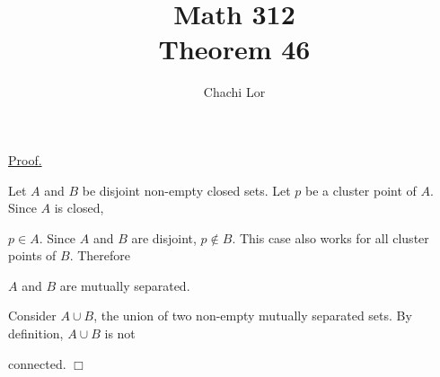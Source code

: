 \documentclass[a4paper]{article}
\title{Math 312\\Theorem 46}
\author{Chachi Lor}
\date{}
\begin{document}
\maketitle
\underline{Proof.}

Let $A$ and $B$ be disjoint non-empty closed sets. Let $p$ be a cluster point of $A$. Since $A$ is closed, 

$p \in A$. Since $A$ and $B$ are disjoint, $p \notin B$. This case also works for all cluster points of $B$. Therefore

$A$ and $B$ are mutually separated.

Consider $A \cup B$, the union of two non-empty mutually separated sets. By definition, $A \cup B$ is not 

connected. $\Box$
\end{document}
